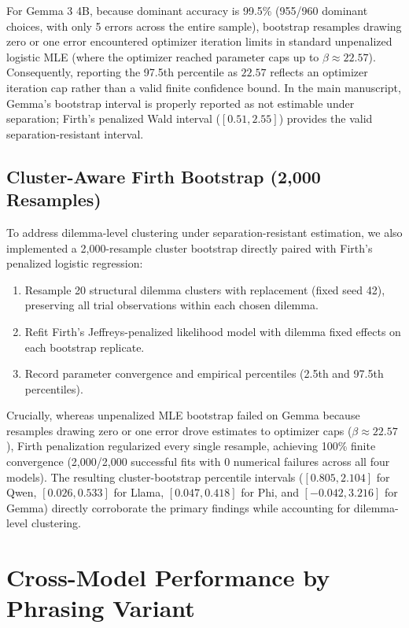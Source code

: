 \documentclass[10pt,journal,compsoc]{IEEEtran}
\begin{document}
For Gemma 3 4B, because dominant accuracy is 99.5\% (955/960 dominant choices, with only 5 errors across the entire sample), bootstrap resamples drawing zero or one error encountered optimizer iteration limits in standard unpenalized logistic MLE (where the optimizer reached parameter caps up to $\beta \approx 22.57$). Consequently, reporting the 97.5th percentile as $22.57$ reflects an optimizer iteration cap rather than a valid finite confidence bound. In the main manuscript, Gemma's bootstrap interval is properly reported as not estimable under separation; Firth's penalized Wald interval ($[0.51, 2.55]$) provides the valid separation-resistant interval.

\subsection{Cluster-Aware Firth Bootstrap (2,000 Resamples)}
To address dilemma-level clustering under separation-resistant estimation, we also implemented a 2,000-resample cluster bootstrap directly paired with Firth's penalized logistic regression:
\begin{enumerate}
  \item Resample 20 structural dilemma clusters with replacement (fixed seed 42), preserving all trial observations within each chosen dilemma.
  \item Refit Firth's Jeffreys-penalized likelihood model with dilemma fixed effects on each bootstrap replicate.
  \item Record parameter convergence and empirical percentiles (2.5th and 97.5th percentiles).
\end{enumerate}
Crucially, whereas unpenalized MLE bootstrap failed on Gemma because resamples drawing zero or one error drove estimates to optimizer caps ($\beta \approx 22.57$), Firth penalization regularized every single resample, achieving 100\% finite convergence (2,000/2,000 successful fits with 0 numerical failures across all four models). The resulting cluster-bootstrap percentile intervals ($[0.805, 2.104]$ for Qwen, $[0.026, 0.533]$ for Llama, $[0.047, 0.418]$ for Phi, and $[-0.042, 3.216]$ for Gemma) directly corroborate the primary findings while accounting for dilemma-level clustering.

\section{Cross-Model Performance by Phrasing Variant}
\end{document}
